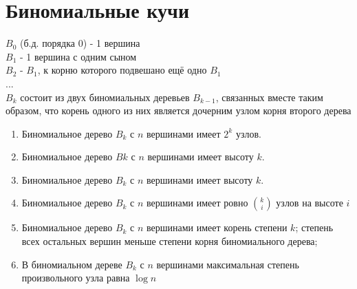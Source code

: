 \documentclass[discrete.tex]{subfiles}
\begin{document}
  \section{Биномиальные кучи}

  \begin{definition}
    $B_0$ (б.д. порядка 0) - 1 вершина\\
    $B_1$ - 1 вершина с одним сыном\\
    $B_2$ - $B_1$, к корню которого подвешано ещё одно $B_1$\\
    ...\\
    $B_k$  состоит из двух биномиальных деревьев $B_{k−1}$, связанных вместе таким образом, что корень одного из них является дочерним узлом корня второго дерева
  \end{definition}

  \begin{properties}
    \begin{enumerate}
      \item Биномиальное дерево $B_k$ с $n$ вершинами имеет $2^k$ узлов.
      \item Биномиальное дерево $Bk$ с $n$ вершинами имеет высоту $k$.
      \item Биномиальное дерево $B_k$ с $n$ вершинами имеет высоту $k$.
      \item Биномиальное дерево $B_k$ с $n$ вершинами имеет ровно $k\choose i$ узлов на высоте $i$
      \item Биномиальное дерево $B_k$ с $n$ вершинами имеет корень степени $k$; степень всех остальных вершин меньше степени корня биномиального дерева;
      \item В биномиальном дереве $B_k$ с $n$ вершинами максимальная степень произвольного узла равна $\log n$
    \end{enumerate}
  \end{properties}
\end{document}
